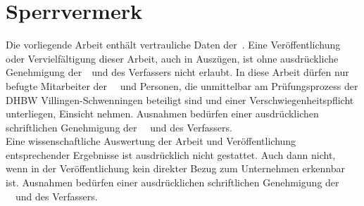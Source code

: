 
\newpage
\thispagestyle{empty}

\section*{Sperrvermerk}

Die vorliegende Arbeit enthält vertrauliche Daten der\ \mycompany . Eine Veröffentlichung oder Vervielfältigung dieser Arbeit, auch in Auszügen, ist ohne ausdrückliche Genehmigung der\ \mycompany \ und des Verfassers nicht erlaubt. In diese Arbeit dürfen nur befugte Mitarbeiter der \ \mycompany \ und Personen, die unmittelbar am Prüfungsprozess der DHBW Villingen-Schwenningen beteiligt sind und einer Verschwiegenheitspflicht unterliegen, Einsicht nehmen. Ausnahmen bedürfen einer ausdrücklichen schriftlichen Genehmigung der \ \mycompany \ und des Verfassers.\\Eine wissenschaftliche Auswertung der Arbeit und Veröffentlichung entsprechender Ergebnisse ist ausdrücklich nicht gestattet. Auch dann nicht, wenn in der Veröffentlichung kein direkter Bezug zum Unternehmen erkennbar ist. Ausnahmen bedürfen einer ausdrücklichen schriftlichen Genehmigung der \ \mycompany \ und des Verfassers.